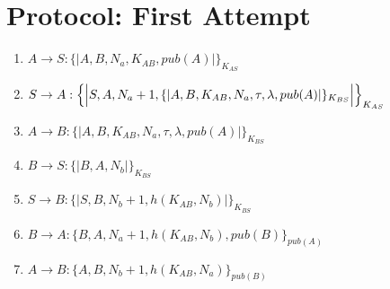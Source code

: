 \section{Protocol: First Attempt}

\begin{enumerate}
    \item $ A \rightarrow S : \{|A, B, N_a, K_{AB}, pub(A)|\}_{K_{AS}}$
    \item $ S \rightarrow A : \Bigl\{\Bigl|S,A, N_a + 1, \{|A,B,K_{AB},N_a, \tau, \lambda, pub(A) |\}_{K_{BS}}\Bigr|\Bigr\}_{K_{AS}}$
    \item $ A \rightarrow B : \{|A,B,K_{AB},N_a, \tau, \lambda, pub(A) |\}_{K_{BS}}$
    \item $ B \rightarrow S : \{|B, A, N_b|\}_{K_{BS}}$
    \item $ S \rightarrow B : \{|S, B, N_b + 1, h(K_{AB}, N_b)|\}_{K_{BS}}$
    \item $ B \rightarrow A : \{B, A, N_a+1, h(K_{AB}, N_b), pub(B)\}_{pub(A)}$
    \item $ A \rightarrow B : \{A, B, N_b+1, h(K_{AB}, N_a)\}_{pub(B)}$

\end{enumerate}